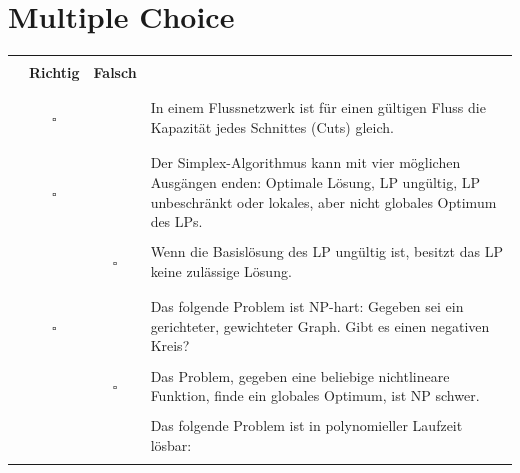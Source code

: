 \documentclass{article}
\newcommand{\checkedbox}[0]{\makebox[0pt][l]{$\square$}\raisebox{.15ex}{\hspace{0.1em}$\checkmark$}}
\begin{document}
\section{Multiple Choice}
\begin{longtable}[H]
    \centering
    \begin{tabular}{ | p{1cm} | c c | p{13cm} |} \hline
    & & & \\
     & \textbf{Richtig} & \textbf{Falsch} &  \\ & & & \\ \hline \hline  & & & \\
     \cite{probeklausur21}\cite{hauptklausur21}\cite{probeklausur24} & $\square$ &  \checkedbox  &  In einem Flussnetzwerk\index{Flussnetzwerk} ist für einen gültigen Fluss\index{Fluss} die Kapazität jedes Schnittes\index{Cut} (Cuts) gleich.\\ & & & \\  \hline \hline & & & \\
     \cite{probeklausur21}\cite{probeklausur24} & $\square$ &  \checkedbox & Der Simplex-Algorithmus\index{implex-Algorithmus} kann mit vier möglichen Ausgängen enden: Optimale Lösung\index{Lösung!optimale}, LP ungültig, LP\index{LP} unbeschränkt oder lokales, aber nicht globales Optimum des LPs. \\ & & & \\
     \cite{nachklausur19} & \checkedbox &  $\square$   & Wenn die Basislösung\index{Basislösung} des LP ungültig ist, besitzt das LP keine zulässige Lösung. \\ & & & \\ \hline \hline & & & \\
     
     \cite{probeklausur21}\cite{probeklausur24} & $\square$ &  \checkedbox  & Das folgende Problem ist NP-hart\index{NP-hart}: Gegeben sei ein gerichteter, gewichteter Graph. Gibt es einen negativen Kreis? \\ & & & \\
     
     \cite{nachklausur19} & \checkedbox &  $\square$  & Das Problem, gegeben eine beliebige nichtlineare Funktion\index{Funktion!nichtlineare}, finde ein globales Optimum,\index{Optimum!globales} ist NP schwer\index{NP schwer}.\\ & & & \\
     
     & & & Das folgende Problem ist in polynomieller Laufzeit\index{Laufzeit!polynomielle} lösbar:\\ & & & \\
     

\end{tabular}
\end{longtable}
\end{document}
